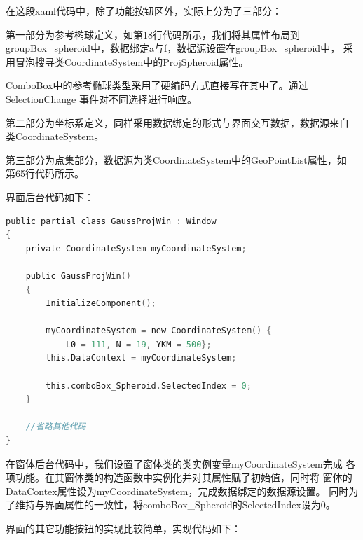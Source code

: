 在这段xaml代码中，除了功能按钮区外，实际上分为了三部分：

第一部分为参考椭球定义，如第18行代码所示，我们将其属性布局到
 groupBox\_spheroid中，数据绑定a与f，数据源设置在groupBox\_spheroid中，
 采用冒泡搜寻类CoordinateSystem中的ProjSpheroid属性。

 ComboBox中的参考椭球类型采用了硬编码方式直接写在其中了。通过SelectionChange
 事件对不同选择进行响应。

第二部分为坐标系定义，同样采用数据绑定的形式与界面交互数据，数据源来自
类CoordinateSystem。

第三部分为点集部分，数据源为类CoordinateSystem中的GeoPointList属性，如
第65行代码所示。

界面后台代码如下：

\begin{lstlisting}[language=C]
public partial class GaussProjWin : Window
{       
    private CoordinateSystem myCoordinateSystem;

    public GaussProjWin()
    {
        InitializeComponent();

        myCoordinateSystem = new CoordinateSystem() {
            L0 = 111, N = 19, YKM = 500};
        this.DataContext = myCoordinateSystem;

        this.comboBox_Spheroid.SelectedIndex = 0;
    }

    //省略其他代码
}
\end{lstlisting}

在窗体后台代码中，我们设置了窗体类的类实例变量myCoordinateSystem完成
各项功能。在其窗体类的构造函数中实例化并对其属性赋了初始值，同时将
窗体的DataContex属性设为myCoordinateSystem，完成数据绑定的数据源设置。
同时为了维持与界面属性的一致性，将comboBox\_Spheroid的SelectedIndex设为0。

界面的其它功能按钮的实现比较简单，实现代码如下：

